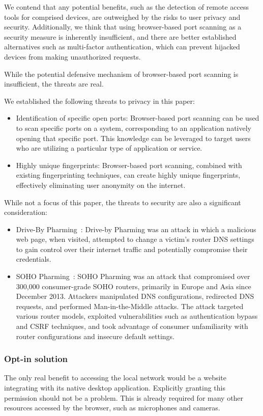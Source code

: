 We contend that any potential benefits, such as the detection of remote access tools for comprised devices, are outweighed by the risks to user privacy and security.
Additionally, we think that using browser-based port scanning as a security measure is inherently insufficient, and there are better established alternatives such as multi-factor authentication, which can prevent hijacked devices from making unauthorized requests.

While the potential defensive mechanism of browser-based port scanning is insufficient, the threats are real.

We established the following threats to privacy in this paper:
\begin{itemize}
    \item Identification of specific open ports: Browser-based port scanning can be used to scan specific ports on a system, corresponding to an application natively opening that specific port. This knowledge can be leveraged to target users who are utilizing a particular type of application or service.
    \item Highly unique fingerprints: Browser-based port scanning, combined with existing fingerprinting techniques, can create highly unique fingerprints, effectively eliminating user anonymity on the internet.
\end{itemize}

While not a focus of this paper, the threats to security are also a significant consideration:
\begin{itemize}
    \item Drive-By Pharming~: Drive-by Pharming was an attack in which a malicious web page, when visited, attempted to change a victim's router DNS settings to gain control over their internet traffic and potentially compromise their credentials.
    \item SOHO Pharming~: SOHO Pharming was an attack that compromised over 300,000 consumer-grade SOHO routers, primarily in Europe and Asia since December 2013. Attackers manipulated DNS configurations, redirected DNS requests, and performed Man-in-the-Middle attacks. The attack targeted various router models, exploited vulnerabilities such as authentication bypass and CSRF techniques, and took advantage of consumer unfamiliarity with router configurations and insecure default settings.
\end{itemize}

\subsubsection{Opt-in solution}
The only real benefit to accessing the local network would be a website integrating with its native desktop application. Explicitly granting this permission should not be a problem. This is already required for many other resources accessed by the browser, such as microphones and cameras.

